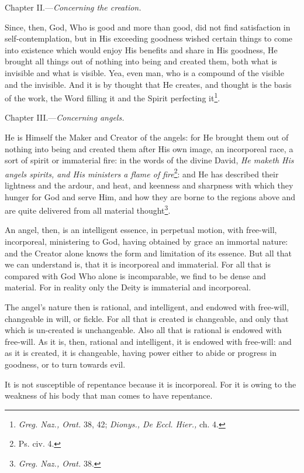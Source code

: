 
Chapter II.—\emph{Concerning the creation.}

Since, then, God, Who is good and more than good, did not find satisfaction in self-contemplation, but in His exceeding goodness wished certain things to come into existence which would enjoy His benefits and share in His goodness, He brought all things out of nothing into being and created them, both what is invisible and what is visible. Yea, even man, who is a compound of the visible and the invisible. And it is by thought that He creates, and thought is the basis of the work, the Word filling it and the Spirit perfecting it\footnote{\emph{Greg. Naz., Orat. }38, 42; \emph{Dionys., De Eccl. Hier., }ch. 4.}.


Chapter III.—\emph{Concerning angels.}

He is Himself the Maker and Creator of the angels: for He brought them out of nothing into being and created them after His own image, an incorporeal race, a sort of spirit or immaterial fire: in the words of the divine David, \emph{He maketh His angels spirits, and His ministers a flame of fire}\footnote{Ps. civ. 4.}: and He has described their lightness and the ardour, and heat, and keenness and sharpness with which they hunger for God and serve Him, and how they are borne to the regions above and are quite delivered from all material thought\footnote{\emph{Greg. Naz., Orat. }38.}.

An angel, then, is an intelligent essence, in perpetual motion, with free-will, incorporeal, ministering to God, having obtained by grace an immortal nature: and the Creator alone knows the form and limitation of its essence. But all that we can understand is, that it is incorporeal and immaterial. For all that is compared with God Who alone is incomparable, we find to be dense and material. For in reality only the Deity is immaterial and incorporeal.

The angel’s nature then is rational, and intelligent, and endowed with free-will, changeable in will, or fickle. For all that is created is changeable, and only that which is un-created is unchangeable. Also all that is rational is endowed with free-will. As it is, then, rational and intelligent, it is endowed with free-will: and as it is created, it is changeable, having power either to abide or progress in goodness, or to turn towards evil.

It is not susceptible of repentance because it is incorporeal. For it is owing to the weakness of his body that man comes to have repentance.

